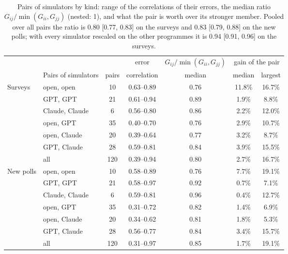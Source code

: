 \begin{table}[h]
\centering\small
\setlength{\tabcolsep}{5pt}
\begin{tabular}{llccccc}
\toprule
 & & & error & $G_{ij}/\min(G_{ii},G_{jj})$ & \multicolumn{2}{c}{gain of the pair} \\
 & Pairs of simulators & pairs & correlation & median & median & largest \\
\midrule
Surveys & open, open & 10 & 0.63--0.89 & 0.76 & 11.8\% & 16.7\% \\
 & GPT, GPT & 21 & 0.61--0.94 & 0.89 & 1.9\% & 8.8\% \\
 & Claude, Claude & 6 & 0.56--0.80 & 0.86 & 2.2\% & 12.0\% \\
 & open, GPT & 35 & 0.40--0.70 & 0.76 & 2.9\% & 10.7\% \\
 & open, Claude & 20 & 0.39--0.64 & 0.77 & 3.2\% & 8.7\% \\
 & GPT, Claude & 28 & 0.59--0.81 & 0.84 & 3.9\% & 15.5\% \\
 & all & 120 & 0.39--0.94 & 0.80 & 2.7\% & 16.7\% \\
\midrule
New polls & open, open & 10 & 0.58--0.89 & 0.76 & 7.7\% & 19.1\% \\
 & GPT, GPT & 21 & 0.58--0.97 & 0.92 & 0.7\% & 7.1\% \\
 & Claude, Claude & 6 & 0.59--0.81 & 0.96 & 0.4\% & 12.7\% \\
 & open, GPT & 35 & 0.31--0.72 & 0.82 & 1.4\% & 6.9\% \\
 & open, Claude & 20 & 0.34--0.62 & 0.81 & 1.8\% & 5.3\% \\
 & GPT, Claude & 28 & 0.56--0.77 & 0.84 & 3.4\% & 15.7\% \\
 & all & 120 & 0.31--0.97 & 0.85 & 1.7\% & 19.1\% \\
\bottomrule
\end{tabular}
\caption{Pairs of simulators by kind: range of the correlations of their errors, the median ratio $G_{ij}/\min(G_{ii},G_{jj})$ (nested: 1), and what the pair is worth over its stronger member. Pooled over all pairs the ratio is 0.80 [0.77, 0.83] on the surveys and 0.83 [0.79, 0.88] on the new polls; with every simulator rescaled on the other programmes it is 0.94 [0.91, 0.96] on the surveys.}
\label{tab:nested}
\end{table}
